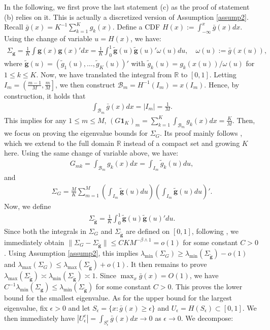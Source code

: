 \documentclass[preprint,11pt]{article}
\newcommand{\mbb}{\mathbb}
\newcommand{\mbf}{\mathbf}
\newcommand{\mcal}{\mathcal}
\numberwithin{equation}{section}
\begin{document}
In the following, we first prove the last statement (c) as the proof of statement (b) relies on it. This is actually a discretized version of Assumption \ref{assump2}. Recall $\bar{g}(x)=K^{-1}\sum_{k=1}^Kg_k(x)$. Define a CDF $H(x):=\int_{-\infty}^x\bar{g}(x)dx$. Using the change of variable $u=H(x)$, we have:
\begin{align*}
    \Sigma_{\bm{g}}=\frac{1}{K}\int \bm{g}(x)\bm{g}(x)'dx=\frac{1}{K}\int_0^1 \tilde{\bm{g}}(u)\tilde{\bm{g}}(u)'\omega(u)du,\quad \omega(u):=\bar{g}(x(u)),
\end{align*}
where $\tilde{\bm{g}}(u)=(\tilde{g}_1(u),\ldots,\tilde{g}_K(u))'$ with $\tilde{g}_k(u)=g_k(x(u))/\omega(u)$ for $1\le k\le K$. Now, we have translated the integral from $\mbb{R}$ to $[0,1]$. Letting $I_m=\left(\frac{m-1}{M},\frac{m}{M}\right]$, we then construct $\mcal{B}_m=H^{-1}(I_m)=x(I_m)$. Hence, by construction, it holds that 
\begin{align*}
    \int_{\mcal{B}_m}\bar{g}(x)dx=|I_m|=\frac{1}{M}.
\end{align*}
This implies for any $1\le m\le M$, $(G\mbf{1}_K)_m=\sum_{k=1}^K\int_{\mcal{B}_m}g_k(x)dx=\frac{K}{M}$. Then, we focus on proving the eigenvalue bounds for $\Sigma_G$. Its proof mainly follows \cite[Proof of Lemma C.3]{austern2025poisson}, which we extend to the full domain $\mbb{R}$ instead of a compact set and  growing $K$ here. Using the same change of variable above, we have:
\begin{align*}
    G_{mk}=\int_{\mcal{B}_m}g_k(x)dx = \int_{I_m}\tilde{g}_k(u)du,
\end{align*}
and
\begin{align*}
    \Sigma_G = \frac{M}{K}\sum_{m=1}^M\left(\int_{I_m}\tilde{\bm{g}}(u)du\right)\left(\int_{I_m}\tilde{\bm{g}}(u)du\right)'.
\end{align*}
Now, we define
\begin{align*}
    \Sigma_{\tilde{\bm{g}}}=\frac{1}{K}\int_0^1 \tilde{\bm{g}}(u)\tilde{\bm{g}}(u)'du.
\end{align*}
Since both the integrals in $\Sigma_G$ and $\Sigma_{\tilde{\bm{g}}}$ are defined on $[0,1]$, following \cite[Proof of Lemma C.3]{austern2025poisson}, we immediately obtain $\|\Sigma_G-\Sigma_{\tilde{\bm{g}}}\|\le CKM^{-\beta\wedge 1}=o(1)$ for some constant $C>0$. Using Assumption \ref{assump2}, this implies $\lambda_{\min}(\Sigma_G)\ge \lambda_{\min}(\Sigma_{\tilde{\bm{g}}})-o(1)$ and $\lambda_{\max}(\Sigma_G)\le \lambda_{\max}(\Sigma_{\tilde{\bm{g}}})+o(1)$. It then remains to prove $\lambda_{\max}(\Sigma_{\tilde{\bm{g}}})\asymp \lambda_{\min}(\Sigma_{\tilde{\bm{g}}})\asymp 1$. Since $\max_x \bar{g}(x)=O(1)$, we have $C^{-1}\lambda_{\min}(\Sigma_{\bm{g}})\le \lambda_{\min}(\Sigma_{\tilde{\bm{g}}})$ for some constant $C>0$. This proves the lower bound for the smallest eigenvalue. As for the upper bound for the largest eigenvalue, fix $\epsilon>0$ and let $S_{\epsilon}=\{x:\bar{g}(x)\ge \epsilon\}$ and $U_{\epsilon}=H(S_{\epsilon})\subset[0,1]$. We then immediately have $|U_{\epsilon}^c|=\int_{S_\epsilon^c}\bar{g}(x)dx\rightarrow 0$ as $\epsilon\rightarrow 0$. We decompose:
\end{document}
